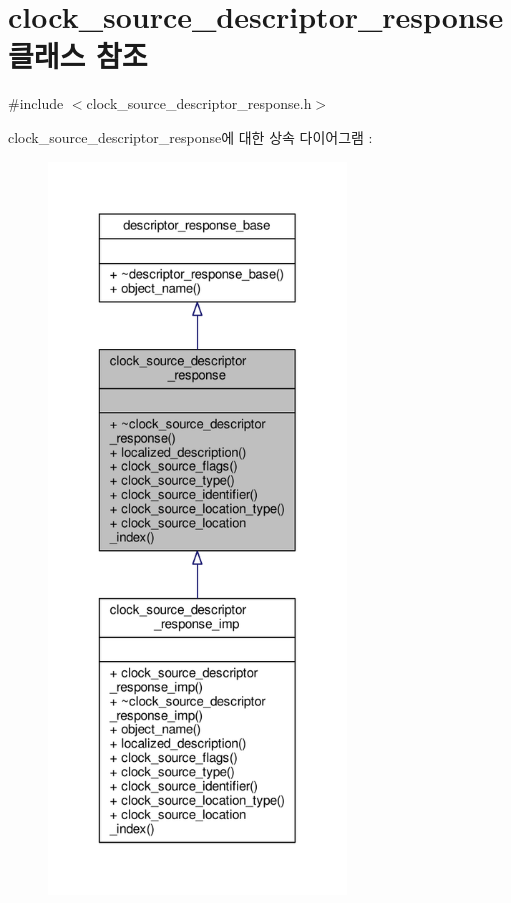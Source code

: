 \hypertarget{classavdecc__lib_1_1clock__source__descriptor__response}{}\section{clock\+\_\+source\+\_\+descriptor\+\_\+response 클래스 참조}
\label{classavdecc__lib_1_1clock__source__descriptor__response}


{\ttfamily \#include $<$clock\+\_\+source\+\_\+descriptor\+\_\+response.\+h$>$}



clock\+\_\+source\+\_\+descriptor\+\_\+response에 대한 상속 다이어그램 \+: 
\nopagebreak
\begin{figure}[H]
\begin{center}
\leavevmode
\includegraphics[height=550pt]{classavdecc__lib_1_1clock__source__descriptor__response__inherit__graph}
\end{center}
\end{figure}


